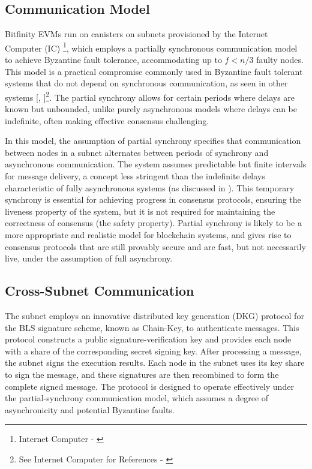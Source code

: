 \documentclass{article}
\begin{document}
\subsection{Communication Model}


Bitfinity EVMs run on canisters on subnets provisioned by the Internet Computer (IC) \footnote{Internet Computer - \cite{icpgeeks}}, which employs a partially synchronous communication model to achieve Byzantine fault tolerance, accommodating up to \(f < n/3\) faulty nodes. This model is a practical compromise commonly used in Byzantine fault tolerant systems that do not depend on synchronous communication, as seen in other systems [\cite{castro1999}, \cite{BKM18}]\footnote{See Internet Computer for References - \cite{icpgeeks}}. The partial synchrony allows for certain periods where delays are known but unbounded, unlike purely asynchronous models where delays can be indefinite, often making effective consensus challenging.

In this model, the assumption of partial synchrony specifies that communication between nodes in a subnet alternates between periods of synchrony and asynchronous communication. The system assumes predictable but finite intervals for message delivery, a concept less stringent than the indefinite delays characteristic of fully asynchronous systems (as discussed in \cite{honeybadger2016}). This temporary synchrony is essential for achieving progress in consensus protocols, ensuring the liveness property of the system, but it is not required for maintaining the correctness of consensus (the safety property).  Partial synchrony is likely to be a more appropriate and realistic model for blockchain systems, and gives rise to consensus protocols that are still provably secure and are fast, but not necessarily live, under the assumption of full asynchrony.





\subsection{Cross-Subnet Communication}

The subnet employs an innovative distributed key generation (DKG) protocol for the BLS signature scheme, known as Chain-Key, to authenticate messages. This protocol constructs a public signature-verification key and provides each node with a share of the corresponding secret signing key. After processing a message, the subnet signs the execution results. Each node in the subnet uses its key share to sign the message, and these signatures are then recombined to form the complete signed message.  The protocol is designed to operate effectively under the partial-synchrony communication model, which assumes a degree of asynchronicity and potential Byzantine faults. 
\end{document}
